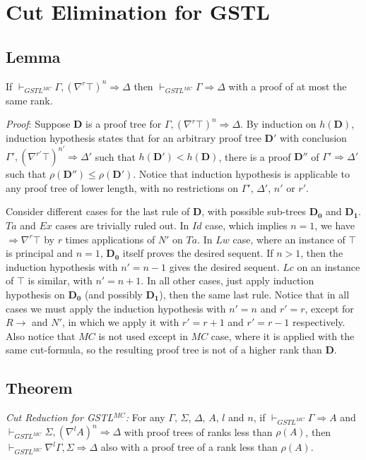 \section{Cut Elimination for GSTL}

\subsection{Lemma}\label{true-assum} If $\vdash_{GSTL^{MC}} \Gamma , (\nabla^r \top)^n \Rightarrow \Delta$ then $\vdash_{GSTL^{MC}} \Gamma \Rightarrow \Delta$ with a proof of at most the same rank.

\textit{Proof}: Suppose $\mathbf{D}$ is a proof tree for $\Gamma , (\nabla^r \top)^n \Rightarrow \Delta$. By induction on $h(\mathbf{D})$, induction hypothesis states that for an arbitrary proof tree $\mathbf{D}'$ with conclusion $\Gamma' , (\nabla^{r'} \top)^{n'} \Rightarrow \Delta'$ such that $h(\mathbf{D}') < h(\mathbf{D})$, there is a proof $\mathbf{D}''$ of $\Gamma' \Rightarrow \Delta'$ such that $\rho(\mathbf{D}'') \leq \rho(\mathbf{D}')$. Notice that induction hypothesis is applicable to any proof tree of lower length, with no restrictions on $\Gamma'$, $\Delta'$, $n'$ or $r'$.

Consider different cases for the last rule of $\mathbf{D}$, with possible sub-trees $\mathbf{D_0}$ and $\mathbf{D_1}$. $Ta$ and $Ex$ cases are trivially ruled out. In $Id$ case, which implies $n = 1$, we have $\Rightarrow \nabla^r \top$ by $r$ times applications of $N'$ on $Ta$. In $Lw$ case, where an instance of $\top$ is principal and $n = 1$, $\mathbf{D_0}$ itself proves the desired sequent. If $n > 1$, then the induction hypothesis with $n' = n - 1$ gives the desired sequent. $Lc$ on an instance of $\top$ is similar, with $n' = n + 1$. In all other cases, just apply induction hypothesis on $\mathbf{D_0}$ (and possibly $\mathbf{D_1}$), then the same last rule. Notice that in all cases we must apply the induction hypothesis with $n' = n$ and $r' = r$, except for $R\rightarrow$ and $N'$, in which we apply it with $r' = r + 1$ and $r' = r - 1$ respectively. Also notice that $MC$ is not used except in $MC$ case, where it is applied with the same cut-formula, so the resulting proof tree is not of a higher rank than $\mathbf{D}$.

\subsection{Theorem}\label{cut-admis} \emph{Cut Reduction for GSTL$^{MC}$: } For any $\Gamma$, $\Sigma$, $\Delta$, $A$, $l$ and $n$, if $\vdash_{GSTL^{MC}} \Gamma \Rightarrow A$ and $\vdash_{GSTL^{MC}} \Sigma , (\nabla^l A)^n \Rightarrow \Delta$ with proof trees of ranks less than $\rho(A)$, then
 $\vdash_{GSTL^{MC}} \nabla^l \Gamma , \Sigma \Rightarrow \Delta$ also with a proof tree of a rank less than $\rho(A)$.
 
